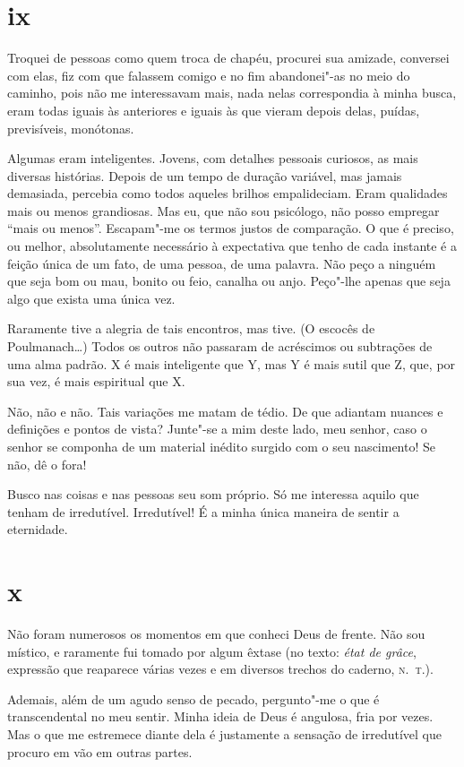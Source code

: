 \section{ix}

Troquei de pessoas como quem troca de chapéu, procurei sua amizade,
conversei com elas, fiz com que falassem comigo e no fim abandonei"-as
no meio do caminho, pois não me interessavam mais, nada nelas
correspondia à minha busca, eram todas iguais às anteriores e
iguais às que vieram depois delas, puídas, previsíveis, monótonas.

Algumas eram inteligentes. Jovens, com detalhes pessoais curiosos,
as mais diversas histórias. Depois de um tempo de duração variável,
mas jamais demasiada, percebia como todos aqueles brilhos
empalideciam. Eram qualidades mais ou menos grandiosas. Mas eu, que não
sou psicólogo, não posso empregar ``mais ou menos''. Escapam"-me os
termos justos de comparação. O que é preciso, ou melhor,
absolutamente necessário à expectativa que tenho de cada instante é a
feição única de um fato, de uma pessoa, de uma palavra. Não peço a
ninguém que seja bom ou mau, bonito ou feio, canalha ou anjo. Peço"-lhe
apenas que seja algo que exista uma única vez.

Raramente tive a alegria de tais encontros, mas tive. (O escocês de
Poulmanach\ldots{}) Todos os outros não passaram de acréscimos ou
subtrações de uma alma padrão. X é mais inteligente que Y, mas Y é mais
sutil que Z, que, por sua vez, é mais espiritual que X.

Não, não e não. Tais variações me matam de tédio. De que adiantam
nuances e definições e pontos de vista? Junte"-se a mim deste lado, meu
senhor, caso o senhor se componha de um material inédito surgido com o
seu nascimento! Se não, dê o fora!

Busco nas coisas e nas pessoas seu som próprio. Só me interessa aquilo
que tenham de irredutível. Irredutível! É a minha única maneira de
sentir a eternidade.

\section{x}

Não foram numerosos os momentos em que conheci Deus de frente. Não sou
místico, e raramente fui tomado por algum êxtase (no texto: \emph{état
de grâce}, expressão que reaparece várias vezes e em diversos trechos do
caderno, \textsc{n.~t.}).

Ademais, além de um agudo senso de pecado, pergunto"-me o que é
transcendental no meu sentir. Minha ideia de Deus é angulosa, fria por
vezes. Mas o que me estremece diante dela é justamente a sensação de
irredutível que procuro em vão em outras partes.

